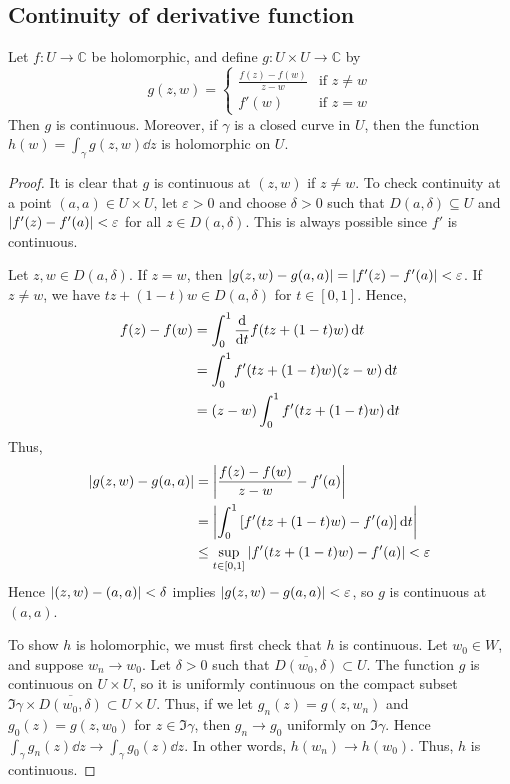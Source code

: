 \subsection{Continuity of derivative function}
\begin{lemma}
	Let \( f \colon U \to \mathbb C \) be holomorphic, and define \( g \colon U \times U \to \mathbb C \) by
	\[
		g(z,w) = \begin{cases}
			\frac{f(z) - f(w)}{z-w} & \text{if } z \neq w \\
			f'(w)                   & \text{if } z = w
		\end{cases}
	\]
	Then \( g \) is continuous.
	Moreover, if \( \gamma \) is a closed curve in \( U \), then the function \( h(w) = \int_\gamma g(z,w) \dd{z} \) is holomorphic on \( U \).
\end{lemma}
\begin{proof}
	It is clear that \( g \) is continuous at \( (z,w) \) if \( z \neq w \).
	To check continuity at a point \( (a,a) \in U \times U \), let \( \varepsilon > 0 \) and choose \( \delta > 0 \) such that \( D(a,\delta) \subseteq U \) and \( \abs{f'(z) - f'(a)} < \varepsilon \) for all \( z \in D(a,\delta) \).
	This is always possible since \( f' \) is continuous.

	Let \( z,w \in D(a,\delta) \).
	If \( z = w \), then \( \abs{g(z,w) - g(a,a)} = \abs{f'(z) - f'(a)} < \varepsilon \).
	If \( z \neq w \), we have \( tz + (1-t)w \in D(a,\delta) \) for \( t \in [0,1] \).
	Hence,
	\begin{align*}
		f(z) - f(w) & = \int_0^1 \dv{t} f(tz+(1-t)w) \dd{t} \\
		            & = \int_0^1 f'(tz+(1-t)w)(z-w) \dd{t}  \\
		            & = (z-w) \int_0^1 f'(tz+(1-t)w) \dd{t}
	\end{align*}
	Thus,
	\begin{align*}
		\abs{g(z,w) - g(a,a)} & = \abs{\frac{f(z) - f(w)}{z-w} - f'(a)}                           \\
		                      & = \abs{\int_0^1 \qty[f'(tz+(1-t)w) - f'(a)] \dd{t}}               \\
		                      & \leq \sup_{t \in [0,1]} \abs{f'(tz+(1-t)w) - f'(a)} < \varepsilon
	\end{align*}
	Hence \( \abs{(z,w) - (a,a)} < \delta \) implies \( \abs{g(z,w) - g(a,a)} < \varepsilon \), so \( g \) is continuous at \( (a,a) \).

	To show \( h \) is holomorphic, we must first check that \( h \) is continuous.
	Let \( w_0 \in W \), and suppose \( w_n \to w_0 \).
	Let \( \delta > 0 \) such that \( \overline{D(w_0, \delta)} \subset U \).
	The function \( g \) is continuous on \( U \times U \), so it is uniformly continuous on the compact subset \( \Im \gamma \times \overline{D(w_0,\delta)} \subset U \times U \).
	Thus, if we let \( g_n(z) = g(z,w_n) \) and \( g_0(z) = g(z,w_0) \) for \( z \in \Im \gamma \), then \( g_n \to g_0 \) uniformly on \( \Im \gamma \).
	Hence \( \int_\gamma g_n(z) \dd{z} \to \int_\gamma g_0(z) \dd{z} \).
	In other words, \( h(w_n) \to h(w_0) \).
	Thus, \( h \) is continuous.


\end{proof}
